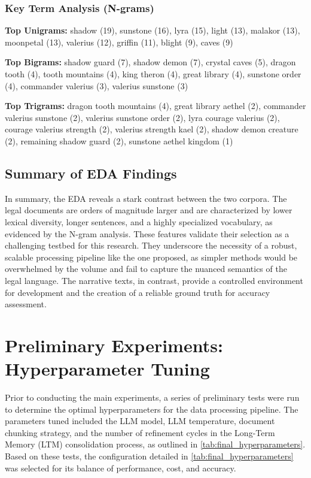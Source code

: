 \subsubsection*{Key Term Analysis (N-grams)}
\textbf{Top Unigrams:} 
shadow (19), sunstone (16), lyra (15), light (13), malakor (13), moonpetal (13), valerius (12), griffin (11), blight (9), caves (9)
\par
\textbf{Top Bigrams:} 
shadow guard (7), shadow demon (7), crystal caves (5), dragon tooth (4), tooth mountains (4), king theron (4), great library (4), sunstone order (4), commander valerius (3), valerius sunstone (3)
\par
\textbf{Top Trigrams:} 
dragon tooth mountains (4), great library aethel (2), commander valerius sunstone (2), valerius sunstone order (2), lyra courage valerius (2), courage valerius strength (2), valerius strength kael (2), shadow demon creature (2), remaining shadow guard (2), sunstone aethel kingdom (1)

\subsection{Summary of EDA Findings}
In summary, the EDA reveals a stark contrast between the two corpora. The legal documents are orders of magnitude larger and are characterized by lower lexical diversity, longer sentences, and a highly specialized vocabulary, as evidenced by the N-gram analysis. These features validate their selection as a challenging testbed for this research. They underscore the necessity of a robust, scalable processing pipeline like the one proposed, as simpler methods would be overwhelmed by the volume and fail to capture the nuanced semantics of the legal language. The narrative texts, in contrast, provide a controlled environment for development and the creation of a reliable ground truth for accuracy assessment.


\section{Preliminary Experiments: Hyperparameter Tuning}
\label{sec:hyperparameter_tuning}
Prior to conducting the main experiments, a series of preliminary tests were run to determine the optimal hyperparameters for the data processing pipeline. The parameters tuned included the LLM model, LLM temperature, document chunking strategy, and the number of refinement cycles in the Long-Term Memory (LTM) consolidation process, as outlined in \cref{tab:final_hyperparameters}. Based on these tests, the configuration detailed in \cref{tab:final_hyperparameters} was selected for its balance of performance, cost, and accuracy.

